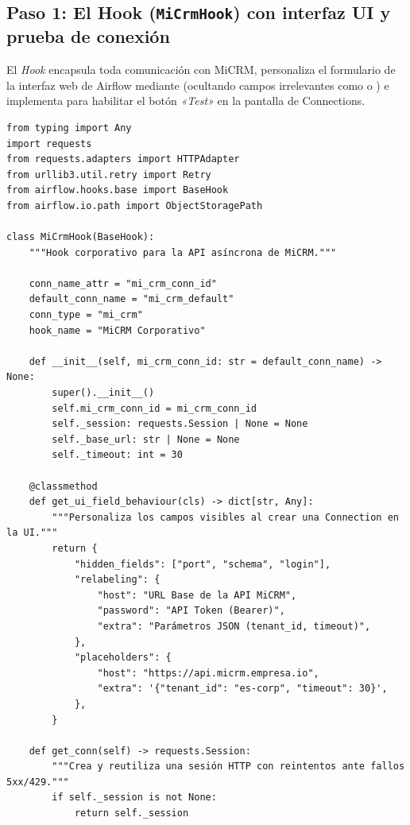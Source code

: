 \subsection{Paso 1: El Hook (\texttt{MiCrmHook}) con interfaz UI y prueba de conexión}

El \textit{Hook} encapsula toda comunicación con MiCRM, personaliza el formulario de la interfaz web de Airflow mediante  (ocultando campos irrelevantes como  o ) e implementa  para habilitar el botón \textit{«Test»} en la pantalla de Connections.

\begin{lstlisting}[style=python, caption={Implementación de \texttt{MiCrmHook} (\texttt{mi\_crm\_provider/hooks/mi\_crm.py}).}, label={lst:custom-hook}]
from typing import Any
import requests
from requests.adapters import HTTPAdapter
from urllib3.util.retry import Retry
from airflow.hooks.base import BaseHook
from airflow.io.path import ObjectStoragePath

class MiCrmHook(BaseHook):
    """Hook corporativo para la API asíncrona de MiCRM."""

    conn_name_attr = "mi_crm_conn_id"
    default_conn_name = "mi_crm_default"
    conn_type = "mi_crm"
    hook_name = "MiCRM Corporativo"

    def __init__(self, mi_crm_conn_id: str = default_conn_name) -> None:
        super().__init__()
        self.mi_crm_conn_id = mi_crm_conn_id
        self._session: requests.Session | None = None
        self._base_url: str | None = None
        self._timeout: int = 30

    @classmethod
    def get_ui_field_behaviour(cls) -> dict[str, Any]:
        """Personaliza los campos visibles al crear una Connection en la UI."""
        return {
            "hidden_fields": ["port", "schema", "login"],
            "relabeling": {
                "host": "URL Base de la API MiCRM",
                "password": "API Token (Bearer)",
                "extra": "Parámetros JSON (tenant_id, timeout)",
            },
            "placeholders": {
                "host": "https://api.micrm.empresa.io",
                "extra": '{"tenant_id": "es-corp", "timeout": 30}',
            },
        }

    def get_conn(self) -> requests.Session:
        """Crea y reutiliza una sesión HTTP con reintentos ante fallos 5xx/429."""
        if self._session is not None:
            return self._session


\end{lstlisting}
